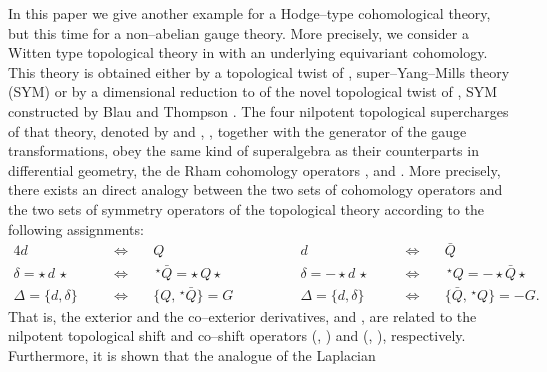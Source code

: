 \documentclass[a4paper,11pt]{article}
\begin{document}
In this paper we give another example for a Hodge--type cohomological theory, 
but this time for a non--abelian gauge theory. More precisely, we consider 
a Witten type topological theory in \coordHE{} with an underlying \coordHE{} 
equivariant cohomology. This theory is obtained either by a topological 
twist of \coordHE{}, \coordHE{} super--Yang--Mills theory (SYM) \cite{15} or by a 
dimensional reduction to \coordHE{} of the \coordHE{} novel topological twist of 
\coordHE{}, \coordHE{} SYM constructed by Blau and Thompson \cite{16}. The four 
nilpotent topological supercharges of that theory, 
denoted by \coordHE{} and 
\coordHE{}, \coordHE{}, together with the 
generator \coordHE{} of the gauge transformations, obey the same 
kind of superalgebra as their counterparts in differential geometry,
the de Rham cohomology operators \coordHE{}, \coordHE{} 
and \myHighlight{$\Delta$}\coordHE{}. More precisely, there exists an direct analogy between 
the two sets of cohomology operators and the two sets of symmetry operators 
of the topological theory according to the following assignments:  
\begin{alignat}{4}
\label{2.1}
d 
&\quad &\Leftrightarrow \quad&
Q
&\qquad\qquad 
d 
&\quad &\Leftrightarrow \quad&
\bar{Q}
\nonumber
\\
\delta = \star\, d\, \star 
&\quad &\Leftrightarrow \quad&
\,^\star \bar{Q} = \star\, Q \star
&\qquad\qquad
\delta = - \star d\, \star 
&\quad &\Leftrightarrow \quad&
\,^\star Q = - \star \bar{Q} \star
\\
\Delta = \{ d, \delta \} 
&\quad &\Leftrightarrow \quad&
\{ Q, \,^\star \bar{Q} \} = G
&\qquad\qquad
\Delta = \{ d, \delta \} 
&\quad &\Leftrightarrow \quad&
\{ \bar{Q}, \,^\star Q \} = - G.
\nonumber
\end{alignat}
That is, the exterior and the co--exterior derivatives, \coordHE{} and \myHighlight{$\delta$}\coordHE{},
are related to the nilpotent topological shift and co--shift operators
(\coordHE{}, \coordHE{}) and (\coordHE{}, \coordHE{}), respectively.
 Furthermore, it is shown that the analogue of the Laplacian \myHighlight{$\Delta$}\coordHE{}  
\end{document}
